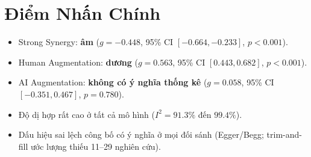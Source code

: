 \section*{Điểm Nhấn Chính}
\begin{itemize}[leftmargin=1.2em]
  \item Strong Synergy: \textbf{âm} (\(g=-0.448\), 95\% CI \([-0.664,-0.233]\), \(p<0.001\)).
  \item Human Augmentation: \textbf{dương} (\(g=0.563\), 95\% CI \([0.443,0.682]\), \(p<0.001\)).
  \item AI Augmentation: \textbf{không có ý nghĩa thống kê} (\(g=0.058\), 95\% CI \([-0.351,0.467]\), \(p=0.780\)).
  \item Độ dị hợp rất cao ở tất cả mô hình (\(I^2=91.3\%\) đến \(99.4\%\)).
  \item Dấu hiệu sai lệch công bố có ý nghĩa ở mọi đối sánh (Egger/Begg; trim-and-fill ước lượng thiếu 11--29 nghiên cứu).
\end{itemize}

